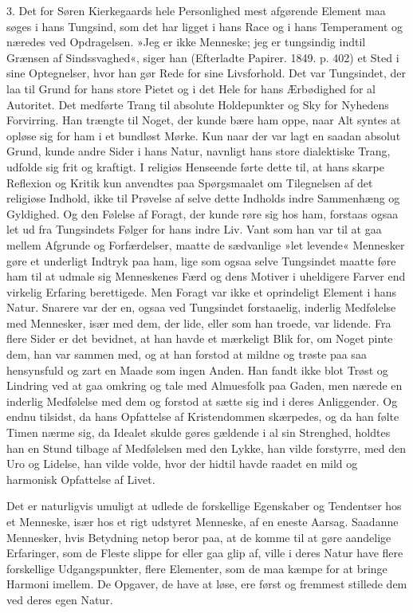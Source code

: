 \documentclass[12pt,a4paper,openany]{book}
\newcommand{\opage}[1]{\marginnote{\footnotesize\textit{[#1]}}}
\begin{document}
3. Det for Søren Kierkegaards hele Personlighed
mest afgørende Element maa søges i hans Tungsind, som
det har ligget i hans Race og i hans Temperament og
næredes ved Opdragelsen. »Jeg er ikke Menneske; jeg
er tungsindig indtil Grænsen af Sindssvaghed«, siger han
(Efterladte Papirer. 1849. p. 402) et Sted i sine Optegnelser,
hvor han gør Rede for sine Livsforhold. Det
var Tungsindet, der laa til Grund for hans store Pietet
og i det Hele for hans Ærbødighed for al Autoritet.
Det medførte Trang til absolute Holdepunkter og Sky for
Nyhedens Forvirring. Han trængte til Noget, der kunde
bære ham oppe, naar Alt syntes at opløse sig for ham i
et bundløst Mørke. Kun naar der var lagt en saadan
absolut Grund, kunde andre Sider i hans Natur, navnligt
hans store dialektiske Trang, udfolde sig frit og kraftigt.
I religiøs Henseende førte dette til, at hans skarpe Reflexion
og Kritik kun anvendtes paa Spørgsmaalet om
Tilegnelsen af det religiøse Indhold, ikke til Prøvelse af
selve dette Indholds indre Sammenhæng og Gyldighed.
Og den Følelse af Foragt, der kunde røre sig hos ham,
forstaas ogsaa let ud fra Tungsindets Følger for hans
indre Liv. Vant som han var til at gaa mellem Afgrunde
og Forfærdelser, maatte de sædvanlige »let levende«
Mennesker gøre et underligt Indtryk paa ham, lige som
ogsaa selve Tungsindet maatte føre ham til at udmale
sig Menneskenes Færd og dens Motiver i uheldigere
Farver end virkelig Erfaring berettigede. Men Foragt
var ikke et oprindeligt Element i hans Natur. Snarere
var der en, ogsaa ved Tungsindet forstaaelig, inderlig
\opage{32}Medfølelse med Mennesker, især med dem, der lide, eller
som han troede, var lidende. Fra flere Sider er det bevidnet,
at han havde et mærkeligt Blik for, om Noget
pinte dem, han var sammen med, og at han forstod at
mildne og trøste paa saa hensynsfuld og zart en Maade
som ingen Anden. Han fandt ikke blot Trøst og Lindring
ved at gaa omkring og tale med Almuesfolk paa
Gaden, men nærede en inderlig Medfølelse med dem og
forstod at sætte sig ind i deres Anliggender. Og endnu
tilsidst, da hans Opfattelse af Kristendommen skærpedes,
og da han følte Timen nærme sig, da Idealet
skulde gøres gældende i al sin Strenghed, holdtes han en
Stund tilbage af Medfølelsen med den Lykke, han vilde
forstyrre, med den Uro og Lidelse, han vilde volde, hvor
der hidtil havde raadet en mild og harmonisk Opfattelse
af Livet.

Det er naturligvis umuligt at udlede de forskellige
Egenskaber og Tendentser hos et Menneske, især hos et
rigt udstyret Menneske, af en eneste Aarsag. Saadanne
Mennesker, hvis Betydning netop beror paa, at de komme
til at gøre aandelige Erfaringer, som de Fleste slippe for
eller gaa glip af, ville i deres Natur have flere forskellige
Udgangspunkter, flere Elementer, som de maa kæmpe
for at bringe Harmoni imellem. De Opgaver, de have
at løse, ere først og fremmest stillede dem ved deres
egen Natur.
\end{document}

